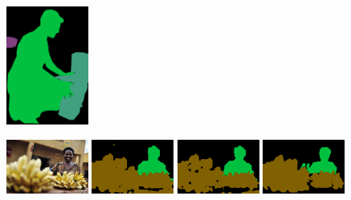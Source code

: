 \begin{figure}[tbh!]
  {\includegraphics[width=0.24\textwidth]{figures/experiments/coco/gt/000000003156_instanceTrainIds.png}}

  
    {\includegraphics[width=0.24\textwidth]{figures/experiments/coco/image/0090.jpg}}
  {\includegraphics[width=0.24\textwidth]{figures/experiments/coco/orgckpt/0090.png}}
  {\includegraphics[width=0.24\textwidth]{figures/experiments/coco/nonnoisy/0090.png}}
  {\includegraphics[width=0.24\textwidth]{figures/experiments/coco/gt/000000008844_instanceTrainIds.png}}


\end{figure}
